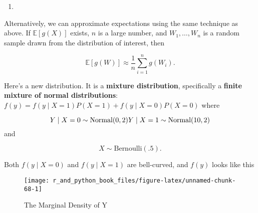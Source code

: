 \documentclass[
  12pt,
  krantz2]{krantz}
\providecommand{\tightlist}{%
  \setlength{\itemsep}{0pt}\setlength{\parskip}{0pt}}
\begin{document}
\begin{enumerate}
\def\labelenumi{\arabic{enumi}.}
\setcounter{enumi}{6}
\tightlist
\item
\end{enumerate}

Alternatively, we can approximate expectations using the same technique as above. If \(\mathbb{E}[g(X)]\) exists, \(n\) is a large number, and \(W_1, \ldots, W_n\) is a random sample drawn from the distribution of interest, then

\begin{equation} 
\mathbb{E}[g(W)] \approx \frac{1}{n}\sum_{i=1}^n g(W_i).
\end{equation}

Here's a new distribution. It is a \textbf{mixture distribution}, specifically a \textbf{finite mixture of normal distributions}: \(f(y) = f(y \mid X=1)P(X=1) + f(y \mid X=0)P(X=0)\) where

\begin{equation} 
Y \mid X=0 \sim \text{Normal}(0, 2) \\
Y \mid X=1 \sim \text{Normal}(10, 2)
\end{equation}
and

\begin{equation} 
X \sim \text{Bernoulli}(.5).
\end{equation}

Both \(f(y \mid X=0)\) and \(f(y \mid X=1)\) are bell-curved, and \(f(y)\) looks like this

\begin{figure}

{\centering \texttt{[image: r\_and\_python\_book\_files/figure-latex/unnamed-chunk-68-1]} 

}

\caption{The Marginal Density of Y}\label{fig:unnamed-chunk-68}
\end{figure}
\end{document}
